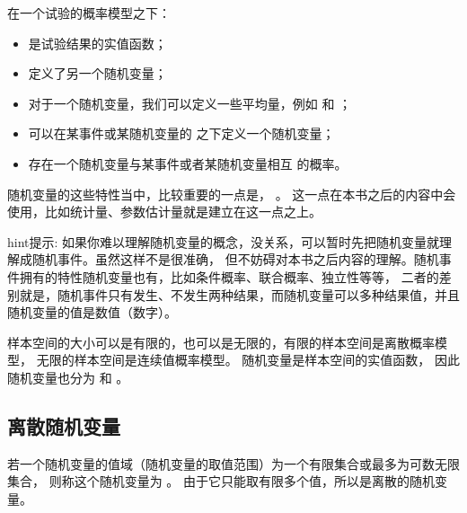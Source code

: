 \documentclass[letterpaper,10pt,english]{sphinxmanual}
\begin{document}
\begin{sphinxShadowBox}

在一个试验的概率模型之下：
\begin{itemize}
\item {} 
 是试验结果的实值函数；

\item {} 
 定义了另一个随机变量；

\item {} 
对于一个随机变量，我们可以定义一些平均量，例如  和  ；

\item {} 
可以在某事件或某随机变量的  之下定义一个随机变量；

\item {} 
存在一个随机变量与某事件或者某随机变量相互  的概率。

\end{itemize}
\end{sphinxShadowBox}

随机变量的这些特性当中，比较重要的一点是， 。
这一点在本书之后的内容中会使用，比如统计量、参数估计量就是建立在这一点之上。

\begin{sphinxadmonition}{hint}{提示:}
如果你难以理解随机变量的概念，没关系，可以暂时先把随机变量就理解成随机事件。虽然这样不是很准确，
但不妨碍对本书之后内容的理解。随机事件拥有的特性随机变量也有，比如条件概率、联合概率、独立性等等，
二者的差别就是，随机事件只有发生、不发生两种结果，而随机变量可以多种结果值，并且随机变量的值是数值（数字）。
\end{sphinxadmonition}

样本空间的大小可以是有限的，也可以是无限的，有限的样本空间是离散概率模型，
无限的样本空间是连续值概率模型。
随机变量是样本空间的实值函数，
因此随机变量也分为  和  。


\subsection{离散随机变量}
\label{\detokenize{_u6982_u7387_u57fa_u7840/content:id11}}
若一个随机变量的值域（随机变量的取值范围）为一个有限集合或最多为可数无限集合，
则称这个随机变量为  。
由于它只能取有限多个值，所以是离散的随机变量。
\end{document}
